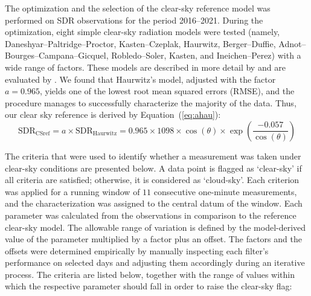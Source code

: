 \documentclass[applsci,article,submit,moreauthors,pdftex]{Definitions/mdpi}
\begin{document}
The optimization and the selection of the clear-sky reference model was
performed on SDR observations for the period 2016--2021. During the
optimization, eight simple clear-sky radiation models were tested
(namely, Daneshyar--Paltridge--Proctor, Kasten--Czeplak, Haurwitz,
Berger--Duffie, Adnot--Bourges--Campana--Gicquel, Robledo--Soler,
Kasten, and Ineichen--Perez) with a wide range of factors. These models
are described in more detail by \citet{Reno2012} and are evaluated by
\citet{Reno2016}. We found that Haurwitz's model, adjusted with the
factor \(a = 0.965\), yields one of the lowest root mean squared errors
(RMSE), and the procedure manages to successfully characterize the
majority of the data. Thus, our clear sky reference is derived by
Equation~(\ref{eq:ahau}): \begin{equation}
\text{SDR}_\text{CSref} = a \times \text{SDR}_\text{Haurwitz} = 0.965 \times 1098 \times \cos(\theta) \times \exp \left( \frac{ - 0.057}{\cos(\theta)} \right) \label{eq:ahau}
\end{equation}

The criteria that were used to identify whether a measurement was taken
under clear-sky conditions are presented below. A data point is flagged
as `clear-sky' if all criteria are satisfied; otherwise, it is
considered as `cloud-sky'. Each criterion was applied for a running
window of \(11\) consecutive one-minute measurements, and the
characterization was assigned to the central datum of the window. Each
parameter was calculated from the observations in comparison to the
reference clear-sky model. The allowable range of variation is defined
by the model-derived value of the parameter multiplied by a factor plus
an offset. The factors and the offsets were determined empirically by
manually inspecting each filter's performance on selected days and
adjusting them accordingly during an iterative process. The criteria are
listed below, together with the range of values within which the
respective parameter should fall in order to raise the clear-sky flag:
\end{document}
